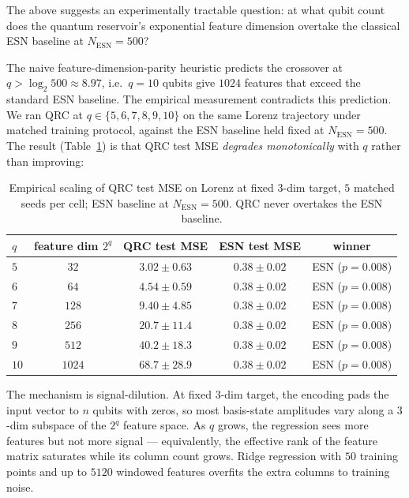 \documentclass[11pt,a4paper]{article}
\begin{document}
The above suggests an experimentally tractable question: at what
qubit count does the quantum reservoir's exponential feature dimension
overtake the classical ESN baseline at $N_{\mathrm{ESN}} = 500$?

The naive feature-dimension-parity heuristic predicts the crossover
at $q > \log_2 500 \approx 8.97$, i.e.\ $q = 10$ qubits give $1024$
features that exceed the standard ESN baseline. The empirical
measurement contradicts this prediction. We ran QRC at $q \in \{5,
6, 7, 8, 9, 10\}$ on the same Lorenz trajectory under matched
training protocol, against the ESN baseline held fixed at
$N_{\mathrm{ESN}} = 500$. The result (Table~\ref{tab:scaling-crossover})
is that QRC test MSE \emph{degrades monotonically} with $q$ rather
than improving:

\begin{table}[h]
    \centering
    \caption{Empirical scaling of QRC test MSE on Lorenz at fixed
      $3$-dim target, $5$ matched seeds per cell; ESN baseline at
      $N_{\mathrm{ESN}} = 500$. QRC never overtakes the ESN baseline.}
    \label{tab:scaling-crossover}
    \begin{tabular}{lcccc}
        \toprule
        $q$ & feature dim $2^q$ & QRC test MSE & ESN test MSE & winner \\
        \midrule
        $5$  & $32$    & $3.02 \pm 0.63$  & $0.38 \pm 0.02$ & ESN ($p = 0.008$) \\
        $6$  & $64$    & $4.54 \pm 0.59$  & $0.38 \pm 0.02$ & ESN ($p = 0.008$) \\
        $7$  & $128$   & $9.40 \pm 4.85$  & $0.38 \pm 0.02$ & ESN ($p = 0.008$) \\
        $8$  & $256$   & $20.7 \pm 11.4$  & $0.38 \pm 0.02$ & ESN ($p = 0.008$) \\
        $9$  & $512$   & $40.2 \pm 18.3$  & $0.38 \pm 0.02$ & ESN ($p = 0.008$) \\
        $10$ & $1024$  & $68.7 \pm 28.9$  & $0.38 \pm 0.02$ & ESN ($p = 0.008$) \\
        \bottomrule
    \end{tabular}
\end{table}

The mechanism is signal-dilution. At fixed $3$-dim target, the
encoding pads the input vector to $n$ qubits with zeros, so most
basis-state amplitudes vary along a $3$-dim subspace of the $2^q$
feature space. As $q$ grows, the regression sees more features but
not more signal --- equivalently, the effective rank of the feature
matrix saturates while its column count grows. Ridge regression with
$50$ training points and up to $5120$ windowed features overfits the
extra columns to training noise.
\end{document}
